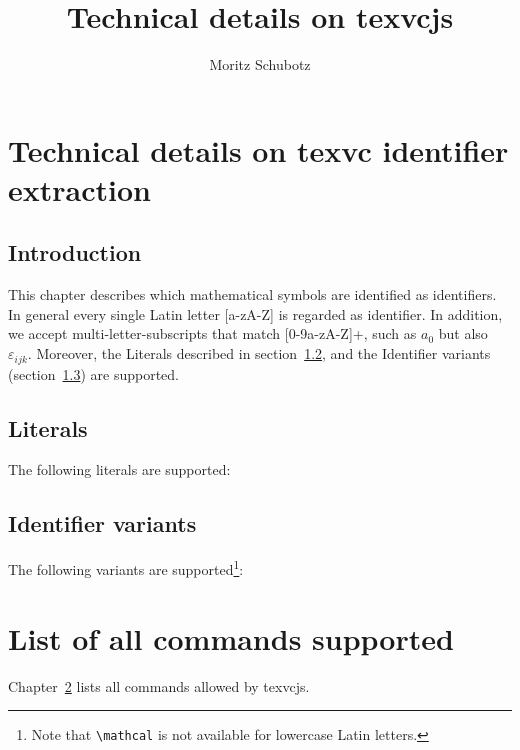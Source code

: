 \documentclass[a4paper,12pt]{report}
\author{Moritz Schubotz}
\title{Technical details on texvcjs}
\begin{document}
\maketitle
\chapter{Technical details on texvc identifier extraction}
\section{Introduction}
This chapter describes which mathematical symbols are identified as identifiers.
In general every single Latin letter [a-zA-Z] is regarded as identifier.
In addition, we accept multi-letter-subscripts that match [0-9a-zA-Z]+, such as $a_0$ but also $\varepsilon_{ijk}$.
Moreover, the Literals described in section~\ref{sc.lit}, and the Identifier variants (section~\ref{sc.var}) are supported.
\section{Literals}\label{sc.lit}
The following literals are supported:



\section{Identifier variants}\label{sc.var}
The following variants are supported\footnote{Note that \texttt{\textbackslash mathcal} is not available for lowercase Latin letters.}:



\chapter{List of all commands supported}\label{ch:all}
Chapter~\ref{ch:all} lists all commands allowed by texvcjs.


\end{document}
